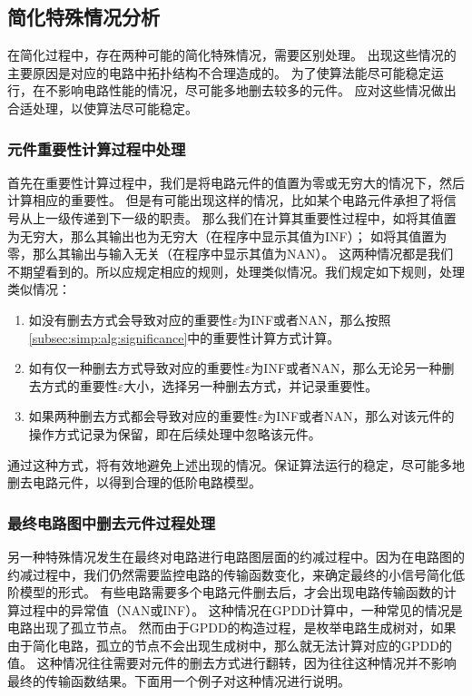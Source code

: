 \subsection{简化特殊情况分析}
\label{subsec:simp:alg:special}

在简化过程中，存在两种可能的简化特殊情况，需要区别处理。
出现这些情况的主要原因是对应的电路中拓扑结构不合理造成的。
为了使算法能尽可能稳定运行，在不影响电路性能的情况，尽可能多地删去较多的元件。
应对这些情况做出合适处理，以使算法尽可能稳定。

\subsubsection{元件重要性计算过程中处理}
\label{subsubsec:simp:alg:special:sign}

首先在重要性计算过程中，我们是将电路元件的值置为零或无穷大的情况下，然后计算相应的重要性。
但是有可能出现这样的情况，比如某个电路元件承担了将信号从上一级传递到下一级的职责。
那么我们在计算其重要性过程中，如将其值置为无穷大，那么其输出也为无穷大（在程序中显示其值为INF）；
如将其值置为零，那么其输出与输入无关（在程序中显示其值为NAN）。
这两种情况都是我们不期望看到的。所以应规定相应的规则，处理类似情况。我们规定如下规则，处理类似情况：

\begin{enumerate}[label=\emph{\alph*})]
	\item 如没有删去方式会导致对应的重要性$\varepsilon$为INF或者NAN，那么按照\ref{subsec:simp:alg:significance}中的重要性计算方式计算。
	\item 如有仅一种删去方式导致对应的重要性$\varepsilon$为INF或者NAN，那么无论另一种删去方式的重要性$\varepsilon$大小，选择另一种删去方式，并记录重要性。
	\item 如果两种删去方式都会导致对应的重要性$\varepsilon$为INF或者NAN，那么对该元件的操作方式记录为保留，即在后续处理中忽略该元件。
\end{enumerate}

通过这种方式，将有效地避免上述出现的情况。保证算法运行的稳定，尽可能多地删去电路元件，以得到合理的低阶电路模型。

\subsubsection{最终电路图中删去元件过程处理}
\label{subsubsec:simp:alg:special:reduce}

另一种特殊情况发生在最终对电路进行电路图层面的约减过程中。因为在电路图的约减过程中，我们仍然需要监控电路的传输函数变化，来确定最终的小信号简化低阶模型的形式。
有些电路需要多个电路元件删去后，才会出现电路传输函数的计算过程中的异常值（NAN或INF）。
这种情况在GPDD计算中，一种常见的情况是电路出现了孤立节点。
然而由于GPDD的构造过程，是枚举电路生成树对，如果由于简化电路，孤立的节点不会出现生成树中，那么就无法计算对应的GPDD的值。
这种情况往往需要对元件的删去方式进行翻转，因为往往这种情况并不影响最终的传输函数结果。下面用一个例子对这种情况进行说明。

